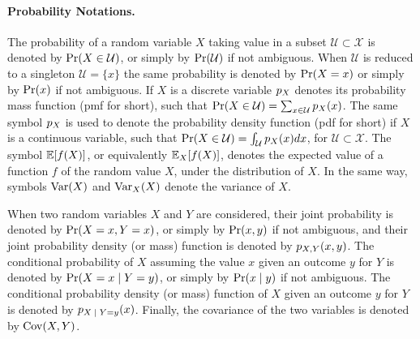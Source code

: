 \paragraph*{Probability Notations.}
The probability of a random variable $X$ taking value in a subset $\mathcal{U}\subset\mathcal{X}$ is denoted by $\mathrm{Pr}(X\in\mathcal{U})$, or simply by $\mathrm{Pr}(\mathcal{U})$ if not ambiguous. When $\mathcal{U}$ is reduced to a singleton $\mathcal{U}=\{x\}$ the same probability is denoted by $\mathrm{Pr}(X=x)$ or simply by $\mathrm{Pr}(x)$ if not ambiguous. If $X$ is a discrete variable $p_X$ denotes its probability mass function (pmf for short), such that $\mathrm{Pr}(X\in\mathcal{U})=\sum_{x\in \mathcal{U}}p_X(x)$. The same symbol $p_X$ is used to denote the probability density function (pdf for short) if $X$ is a continuous variable, such that $\mathrm{Pr}(X\in \mathcal{U}) = \int_{\mathcal{U}}p_X(x)dx$, for $\mathcal{U}\subset\mathcal{X}$. 
The symbol $\mathbb{E}[f(X)]$, or equivalently $\mathbb{E}_X[f(X)]$, denotes the expected value of a function $f$ of the random value $X$, under the distribution of $X$. In the same way, symbols $\mathrm{Var}(X)$ and $\mathrm{Var}_X(X)$ denote the variance of $X$.

When two random variables $X$ and $Y$ are considered, their joint probability is denoted by $\mathrm{Pr}(X=x,Y=x)$, or simply by $\mathrm{Pr}(x,y)$ if not ambiguous, and their joint probability density (or mass) function is denoted by $p_{X,Y}(x,y)$. The conditional probability of $X$ assuming the value $x$ given an outcome $y$ for $Y$ is denoted by $\prob (\given{X=x}{Y=y})$, or simply by $\prob(\given{x}{y})$ if not ambiguous. The conditional probability density (or mass) function of $X$ given an outcome $y$ for $Y$ is denoted by $\pdf_{\given{X} {Y=y}}(x)$. Finally, the covariance of the two variables is denoted by $\mathrm{Cov}(X,Y)$.\\


